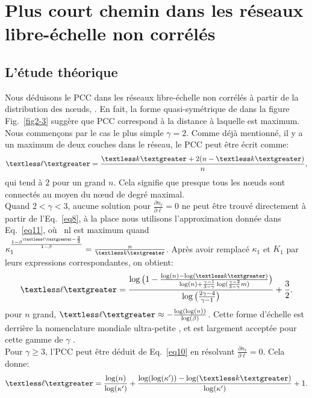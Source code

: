 \section{Plus court chemin dans les réseaux libre-échelle non corrélés }
   \subsection{L'étude théorique}
   \label{pcc}
   Nous déduisons le PCC dans les réseaux libre-échelle non corrélés à partir de la distribution des nœuds, \nl. En fait, la forme quasi-symétrique de \nl dans la figure Fig.~\ref{fig2-3} suggère que PCC correspond à la distance à laquelle \nl est maximum. \\ Nous commençons par le cas le plus simple $\gamma=2$. Comme déjà mentionné, il y a un maximum de deux couches dans le réseau, le PCC peut être écrit comme:
   \begin{align}
   	\textless \ell \textgreater=\frac{\km+2(n-\km)}{n},
   	\label{eq14}  
   \end{align}
qui tend à $2$ pour un grand $n$. Cela signifie que presque tous les nœuds sont connectés au moyen du nœud de degré maximal. \\
Quand $ 2<\gamma<3 $, aucune solution pour $\frac{\partial n_{\ell}}{\partial\ell}=0$ ne peut être trouvé directement à partir de l'Eq.~\ref{eq8}, à la place nous utilisons l'approximation donnée dans Eq.~\ref{eq11}, où \ nl est maximum quand $\kappa_1^{\frac{1-\beta^{\textless \ell \textgreater-\frac{3}{2}}}{1-\beta}}=\frac{n}{\km}$. Après avoir remplacé $\kappa_1 $ et $K_1$ par leurs expressions correspondantes, on obtient:
\begin{align}
	\textless \ell \textgreater=\frac{\log\big(1-\frac{\log(n)-\log(\km)}{\log(n)+\frac{\gamma-1}{3-\gamma}\log(\frac{\gamma-2}{3-\gamma}m)}\big)}{\log\big(\frac{2\gamma-4}{\gamma-1}\big)}+\frac{3}{2}.
	\label{eq12}
\end{align}
pour $n$ grand, $\textless \ell \textgreater \approx -\frac{\log(\log(n))}{\log(\beta)}$.
Cette forme d'échelle est derrière la nomenclature mondiale ultra-petite \cite{Cohen-Havlin2003}, et est largement acceptée pour cette gamme de $\gamma $ \cite{Do-al2003,Cohen-al2002,Chung-Lu2002,Fox-Bellwood2014,Hofstad-al2014}.\\
Pour $\gamma\ge 3 $, l'PCC peut être déduit de Eq.~\ref{eq10} en résolvant $\frac{\partial n_{\ell}}{\partial\ell}=0$. Cela donne:
\begin{align}
	\textless \ell \textgreater=\frac{\log (n)}{\log(\kappa')}+\frac{\log(\log(\kappa'))-\log(\km)}{\log(\kappa')}+1.
	\label{eq13}
\end{align}
